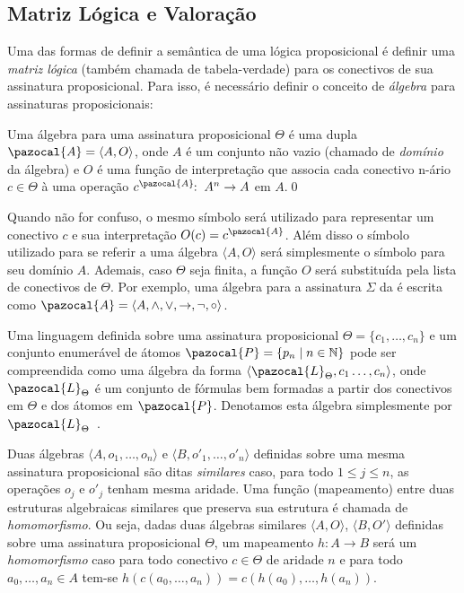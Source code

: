     \subsection{Matriz Lógica e Valoração}
        Uma das formas de definir a semântica de uma lógica proposicional é definir uma \textit{matriz lógica} (também chamada de tabela-verdade) para os conectivos de sua assinatura proposicional. Para isso, é necessário definir o conceito de \textit{álgebra} para assinaturas proposicionais:

        \begin{definicao}\label{def:algebra}
            Uma álgebra para uma assinatura proposicional $\Theta$ é uma dupla $\pazocal{A} = \langle A, O \rangle$, onde $A$ é um conjunto não vazio (chamado de \textit{domínio} da álgebra) e $O$ é uma função de interpretação que associa cada conectivo n-ário $c \in \Theta$ à uma operação $c^{\pazocal{A}}\!\! : \; A^{n} \to A$ em $A$.\qed{}
        \end{definicao}

        Quando não for confuso, o mesmo símbolo será utilizado para representar um conectivo $c$ e sua interpretação $O(c) = c^{\pazocal{A}}$. Além disso o símbolo utilizado para se referir a uma álgebra $\langle A, O \rangle$ será simplesmente o símbolo para seu domínio $A$. Ademais, caso $\Theta$ seja finita, a função $O$ será substituída pela lista de conectivos de $\Theta$. Por exemplo, uma álgebra para a assinatura $\Sigma$ da \lfium{} é escrita como $\pazocal{A} = \langle A,\land, \lor, \to, \neg, \circ \rangle$.

        \begin{observacao}
            Uma linguagem definida sobre uma assinatura proposicional $\Theta = \{c_{1}, \ldots, c_{n}\}$ e um conjunto enumerável de átomos $\pazocal{P} = \{p_{n} \; | \; n \in \mathbb{N} \}$ pode ser compreendida como uma álgebra da forma $\langle \pazocal{L}_{\Theta}, c_{1}\ldots, c_{n} \rangle$, onde $\pazocal{L}_{\Theta}$ é um conjunto de fórmulas bem formadas a partir dos conectivos em $\Theta$ e dos átomos em $\pazocal{P}$. Denotamos esta álgebra simplesmente por $\pazocal{L}_{\Theta}$~\cite{Sikorski1966-SIKAOF,Wojcicki1984-WJCLOP}.
        \end{observacao}

        Duas álgebras $\langle A, o_1, \ldots, o_n \rangle$ e $\langle B, o'_1, \ldots, o'_n \rangle$ definidas sobre uma mesma assinatura proposicional são ditas \textit{similares} caso, para todo $1 \leq j \leq n$, as operações $o_j$ e $o'_j$ tenham mesma aridade. Uma função (mapeamento) entre duas estruturas algebraicas similares que preserva sua estrutura é chamada de \textit{homomorfismo}. Ou seja, dadas duas álgebras similares $\langle A, O \rangle$, $\langle B, O' \rangle$ definidas sobre uma assinatura proposicional $\Theta$, um mapeamento $h : A \to B$ será um \textit{homomorfismo} caso para todo conectivo $c \in \Theta$ de aridade $n$ e para todo $a_{0},\ldots,a_{n} \in A$ tem-se $h(c(a_{0},\ldots, a_{n})) = c(h(a_{0}),\ldots, h(a_{n}))$.


